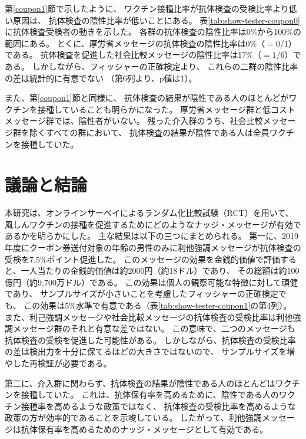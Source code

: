 \documentclass[
  11pt,
  a4paper,
]{article}
\begin{document}
第\ref{coupon1}節で示したように、
ワクチン接種比率が抗体検査の受検比率より低い原因は、
抗体検査の陰性比率が低いことにある。
表\ref{tab:show-tester-coupon0}に抗体検査受検者の動きを示した。
各群の抗体検査の陰性比率は0\%から100\%の範囲にある。
とくに、厚労省メッセージの抗体検査の陰性比率は0\%（\(=0/1\)）である。
抗体検査を促進した社会比較メッセージの陰性比率は17\%（\(=1/6\)）である。
しかしながら、フィッシャーの正確検定より、
これらの二群の陰性比率の差は統計的に有意でない
（第6列より、p値は1）。

また、第\ref{coupon1}節と同様に、
抗体検査の結果が陰性である人のほとんどがワクチンを接種していることも明らかになった。
厚労省メッセージ群と低コストメッセージ群では、陰性者がいない。
残った介入群のうち、社会比較メッセージ群を除くすべての群において、
抗体検査の結果が陰性である人は全員ワクチンを接種していた。

\hypertarget{conclusion}{%
\section{議論と結論}\label{conclusion}}

本研究は、オンラインサーベイによるランダム化比較試験（RCT）を用いて、
風しんワクチンの接種を促進するためにどのようなナッジ・メッセージが有効であるかを明らかにした。
主な結果は以下の三つにまとめられる。
第一に、2019年度にクーポン券送付対象の年齢の男性のみに利他強調メッセージが抗体検査の受検を7.5\%ポイント促進した。
このメッセージの効果を金銭的価値で評価すると、一人当たりの金銭的価値は約2000円（約18ドル）であり、
その総額は約100億円（約9,700万ドル）である。
この効果は個人の観察可能な特徴に対して頑健であり、
サンプルサイズが小さいことを考慮したフィッシャーの正確検定でも、
この効果は5\%水準で有意である（表\ref{tab:show-tester-coupon1}の第4列）。
また、利己強調メッセージや社会比較メッセージの抗体検査の受検比率は利他強調メッセージ群のそれと有意な差ではない。
この意味で、二つのメッセージも抗体検査の受検を促進した可能性がある。
しかしながら、抗体検査の受検比率の差は検出力を十分に保てるほどの大きさではないので、
サンプルサイズを増やした再検証が必要である。

第二に、介入群に関わらず、抗体検査の結果が陰性である人のほとんどはワクチンを接種していた。
これは、抗体保有率を高めるために、陰性である人のワクチン接種率を高めるような政策ではなく、
抗体検査の受検比率を高めるような政策の方が効率的であることを示唆している。
したがって、利他強調メッセージは抗体保有率を高めるためのナッジ・メッセージとして有効である。
\end{document}
